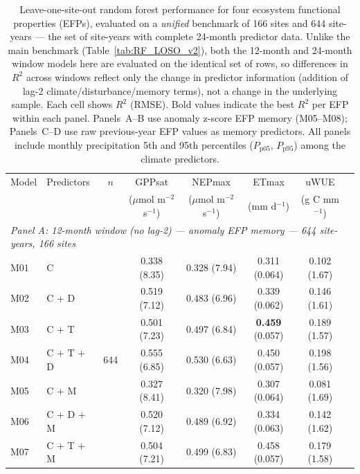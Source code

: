 \begin{table}[htbp]
\centering
\caption{Leave-one-site-out random forest performance for four ecosystem
functional properties (EFPs), evaluated on a \emph{unified} benchmark of
166 sites and 644 site-years --- the set of site-years with complete
24-month predictor data. Unlike the main benchmark (Table~\ref{tab:RF_LOSO_v2}),
both the 12-month and 24-month window models here are evaluated on the
identical set of rows, so differences in $R^2$ across windows reflect only
the change in predictor information (addition of lag-2 climate/disturbance/memory
terms), not a change in the underlying sample. Each cell shows $R^2$ (RMSE).
Bold values indicate the best $R^2$ per EFP within each panel. Panels~A--B use
anomaly z-score EFP memory (M05--M08); Panels~C--D use raw previous-year EFP
values as memory predictors. All panels include monthly precipitation 5th and
95th percentiles ($P_\mathrm{p05}$, $P_\mathrm{p95}$) among the climate
predictors.}
\label{tab:RF_LOSO_24mbench}
\footnotesize
\begin{tabular}{llcccccc}
\toprule
Model & Predictors & $n$ &
  GPPsat & NEPmax & ETmax & uWUE \\
  & & &
  ($\mu$mol m$^{-2}$ s$^{-1}$) &
  ($\mu$mol m$^{-2}$ s$^{-1}$) &
  (mm d$^{-1}$) &
  (g C mm$^{-1}$) \\
\midrule
\multicolumn{7}{l}{\textit{Panel A: 12-month window (no lag-2) --- anomaly EFP memory --- 644 site-years, 166 sites}} \\
\midrule
M01 & C                 & \multirow{8}{*}{644} & 0.338 (8.35) & 0.328 (7.94) & 0.311 (0.064) & 0.102 (1.67) \\
M02 & C + D             &                      & 0.519 (7.12) & 0.483 (6.96) & 0.339 (0.062) & 0.146 (1.61) \\
M03 & C + T             &                      & 0.501 (7.23) & 0.497 (6.84) & \textbf{0.459} (0.057) & 0.189 (1.57) \\
M04 & C + T + D         &                      & 0.555 (6.85) & 0.530 (6.63) & 0.450 (0.057) & 0.198 (1.56) \\
M05 & C + M             &                      & 0.327 (8.41) & 0.320 (7.98) & 0.307 (0.064) & 0.081 (1.69) \\
M06 & C + D + M         &                      & 0.520 (7.12) & 0.489 (6.92) & 0.334 (0.063) & 0.142 (1.62) \\
M07 & C + T + M         &                      & 0.504 (7.21) & 0.499 (6.83) & 0.458 (0.057) & 0.179 (1.58) \\

\end{tabular}
\end{table}
